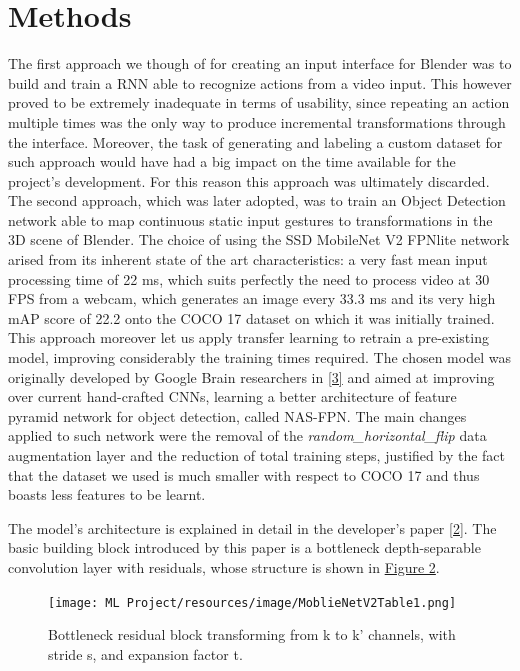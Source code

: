 \documentclass[a4paper, 12pt]{article}
\begin{document}
\section{Methods}
\begin{flushleft}
The first approach we though of for creating an input interface for Blender was to build and train a RNN able to recognize actions from a video input. This however proved to be extremely inadequate in terms of usability, since repeating an action multiple times was the only way to produce incremental transformations through the interface. Moreover, the task of generating and labeling a custom dataset for such approach would have had a big impact on the time available for the project's development. For this reason this approach was ultimately discarded.\linebreak
The second approach, which was later adopted, was to train an Object Detection network able to map continuous static input gestures to transformations in the 3D scene of Blender. The choice of using the SSD MobileNet V2 FPNlite network arised from its inherent state of the art characteristics: a very fast mean input processing time of 22 ms, which suits perfectly the need to process video at 30 FPS from a webcam, which generates an image every 33.3 ms and its very high mAP score of 22.2 onto the COCO 17 dataset on which it was initially trained.\linebreak
This approach moreover let us apply transfer learning to retrain a pre-existing model, improving considerably the training times required.
The chosen model was originally developed by Google Brain researchers in \hyperref[Ref1]{[3]} and aimed at improving over current hand-crafted CNNs, learning a better architecture of feature pyramid network for object detection, called NAS-FPN. The main changes applied to such network were the removal of the \textit{random\_horizontal\_flip} data augmentation layer and the reduction of total training steps, justified by the fact that the dataset we used is much smaller with respect to COCO 17 and thus boasts less features to be learnt.\linebreak

The model's architecture is explained in detail in the developer's paper \hyperref[RefArchSSD]{[2]}.
The basic building block introduced by this paper is a bottleneck depth-separable convolution layer with residuals, whose structure is shown in \hyperref[figure2]{Figure 2}.

\begin{figure}[!h]
    \centering
    \texttt{[image: ML Project/resources/image/MoblieNetV2Table1.png]} \caption{Bottleneck residual block transforming from k to k' channels, with stride s, and expansion factor t.}
\end{figure}
\label{figure2}


\end{flushleft}
\end{document}
